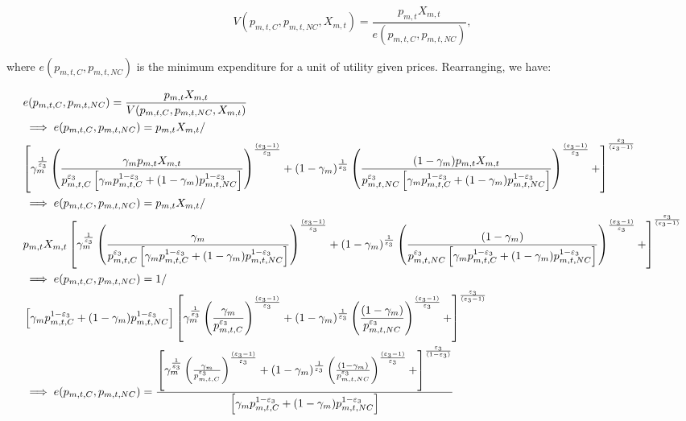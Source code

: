 \begin{equation}
V(p_{m,t,C},p_{m,t,NC}, X_{m,t}) = \frac{p_{m,t}X_{m,t}}{e(p_{m,t,C},p_{m,t,NC})},
\end{equation}
    
    
\noindent\noindent where $e(p_{m,t,C},p_{m,t,NC})$ is the minimum expenditure for a unit of utility given prices.  Rearranging, we have: 
    
 \begin{equation}
 \label{eqn:price_comp}
 \begin{split}
& e(p_{m,t,C},p_{m,t,NC}) = \frac{p_{m,t}X_{m,t}}{V(p_{m,t,C},p_{m,t,NC}, X_{m,t})}\\
&\implies e(p_{m,t,C},p_{m,t,NC}) = p_{m,t}X_{m,t}/ \\
& {\left[\gamma_{m}^{\frac{1}{\ve_{3}}}\left( \frac{\gamma_{m}p_{m,t}X_{m,t}}{p_{m,t,C}^{\ve_{3}}\left[\gamma_{m}p_{m,t,C}^{1-\ve_{3}}+(1-\gamma_{m})p_{m,t,NC}^{1-\ve_{3}}\right]}\right)^{\frac{(\ve_{3}-1)}{\ve_{3}}}+(1-\gamma_{m})^{\frac{1}{\ve_{3}}}\left(\frac{(1-\gamma_{m})p_{m,t}X_{m,t}}{p_{m,t,NC}^{\ve_{3}}\left[\gamma_{m}p_{m,t,C}^{1-\ve_{3}}+(1-\gamma_{m})p_{m,t,NC}^{1-\ve_{3}}\right]}\right)^{\frac{(\ve_{3}-1)}{\ve_{3}}}+\right]^{\frac{\ve_{3}}{(\ve_{3}-1)}}}\\
&\implies e(p_{m,t,C},p_{m,t,NC}) = p_{m,t}X_{m,t}/ \\
& {p_{m,t}X_{m,t}\left[\gamma_{m}^{\frac{1}{\ve_{3}}}\left( \frac{\gamma_{m}}{p_{m,t,C}^{\ve_{3}}\left[\gamma_{m}p_{m,t,C}^{1-\ve_{3}}+(1-\gamma_{m})p_{m,t,NC}^{1-\ve_{3}}\right]}\right)^{\frac{(\ve_{3}-1)}{\ve_{3}}}+(1-\gamma_{m})^{\frac{1}{\ve_{3}}}\left(\frac{(1-\gamma_{m})}{p_{m,t,NC}^{\ve_{3}}\left[\gamma_{m}p_{m,t,C}^{1-\ve_{3}}+(1-\gamma_{m})p_{m,t,NC}^{1-\ve_{3}}\right]}\right)^{\frac{(\ve_{3}-1)}{\ve_{3}}}+\right]^{\frac{\ve_{3}}{(\ve_{3}-1)}}}\\
&\implies e(p_{m,t,C},p_{m,t,NC}) = 1/ \\
& \left[\gamma_{m}p_{m,t,C}^{1-\ve_{3}}+(1-\gamma_{m})p_{m,t,NC}^{1-\ve_{3}}\right]{\left[\gamma_{m}^{\frac{1}{\ve_{3}}}\left( \frac{\gamma_{m}}{p_{m,t,C}^{\ve_{3}}}\right)^{\frac{(\ve_{3}-1)}{\ve_{3}}}+(1-\gamma_{m})^{\frac{1}{\ve_{3}}}\left(\frac{(1-\gamma_{m})}{p_{m,t,NC}^{\ve_{3}}}\right)^{\frac{(\ve_{3}-1)}{\ve_{3}}}+\right]^{\frac{\ve_{3}}{(\ve_{3}-1)}}}\\
&\implies e(p_{m,t,C},p_{m,t,NC}) = 
\frac{\left[\gamma_{m}^{\frac{1}{\ve_{3}}}\left( \frac{\gamma_{m}}{p_{m,t,C}^{\ve_{3}}}\right)^{\frac{(\ve_{3}-1)}{\ve_{3}}}+(1-\gamma_{m})^{\frac{1}{\ve_{3}}}\left(\frac{(1-\gamma_{m})}{p_{m,t,NC}^{\ve_{3}}}\right)^{\frac{(\ve_{3}-1)}{\ve_{3}}}+\right]^{\frac{\ve_{3}}{(1-\ve_{3})}}}{\left[\gamma_{m}p_{m,t,C}^{1-\ve_{3}}+(1-\gamma_{m})p_{m,t,NC}^{1-\ve_{3}}\right]}\\

\end{split}
\end{equation}
